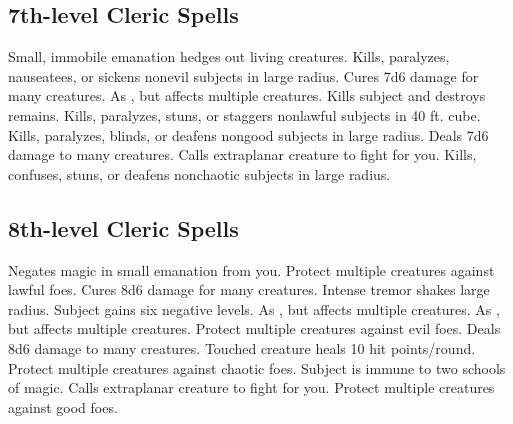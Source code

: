 \subsection{7th-level Cleric Spells}
\begin{spelllist}
   Small, immobile emanation hedges out living creatures.
   Kills, paralyzes, nauseatees, or sickens nonevil subjects in large radius.
   Cures 7d6 damage for many creatures.
   As , but affects multiple creatures.
  \F Kills subject and destroys remains.
   Kills, paralyzes, stuns, or staggers nonlawful subjects in 40 ft. cube.
   Kills, paralyzes, blinds, or deafens nongood subjects in large radius.
   Deals 7d6 damage to many creatures.
   Calls extraplanar creature to fight for you.
   Kills, confuses, stuns, or deafens nonchaotic subjects in large radius.
\end{spelllist}

\subsection{8th-level Cleric Spells}
\begin{spelllist}
   Negates magic in small emanation from you.
  \F Protect multiple creatures against lawful foes. 
   Cures 8d6 damage for many creatures.
   Intense tremor shakes large radius.
   Subject gains six negative levels.
   As , but affects multiple creatures.
   As , but affects multiple creatures.
  \F Protect multiple creatures against evil foes. 
   Deals 8d6 damage to many creatures.
   Touched creature heals 10 hit points/round.
  \F Protect multiple creatures against chaotic foes. 
   Subject is immune to two schools of magic.
   Calls extraplanar creature to fight for you.
  \F Protect multiple creatures against good foes. 
\end{spelllist}

